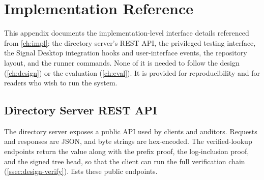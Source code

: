 \chapter{Implementation Reference}\label{app:apiref}

This appendix documents the implementation-level interface details referenced from
\cref{ch:impl}: the directory server's REST API, the privileged testing interface, the
Signal Desktop integration hooks and user-interface events, the repository layout, and the
runner commands. None of it is needed to follow the design (\cref{ch:design}) or the
evaluation (\cref{ch:eval}). It is provided for reproducibility and for readers who wish to
run the system.

\section{Directory Server REST API}\label{sec:apiref-rest}

The directory server exposes a public API used by clients and auditors. Requests and
responses are JSON, and byte strings are hex-encoded. The verified-lookup endpoints return the
value along with the prefix proof, the log-inclusion proof, and the signed tree head, so
that the client can run the full verification chain (\cref{ssec:design-verify}).
 lists these public endpoints.

